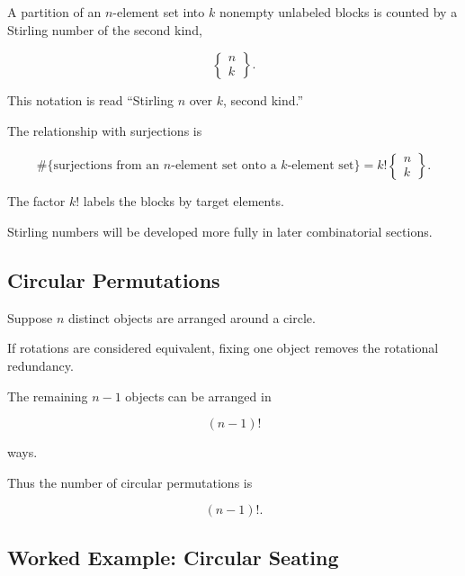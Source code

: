 A partition of an \(n\)-element set into \(k\) nonempty unlabeled
blocks is counted by a Stirling number of the second kind,

\[
\boxed{
\left\{
\begin{matrix}
n\\
k
\end{matrix}
\right\}.
}
\]

This notation is read ``Stirling \(n\) over \(k\), second kind.''

The relationship with surjections is

\[
\boxed{
\#\{\text{surjections from an }n\text{-element set onto a }
k\text{-element set}\}
=
k!
\left\{
\begin{matrix}
n\\
k
\end{matrix}
\right\}.
}
\]

The factor \(k!\) labels the blocks by target elements.

Stirling numbers will be developed more fully in later combinatorial
sections.

\subsection{Circular Permutations}
\label{subsec:circular-permutations}

Suppose \(n\) distinct objects are arranged around a circle.

If rotations are considered equivalent, fixing one object removes the
rotational redundancy.

The remaining \(n-1\) objects can be arranged in

\[
\boxed{
(n-1)!
}
\]

ways.

Thus the number of circular permutations is

\[
\boxed{
(n-1)!.
}
\]

\subsection{Worked Example: Circular Seating}
\label{subsec:worked-circular-seating}

